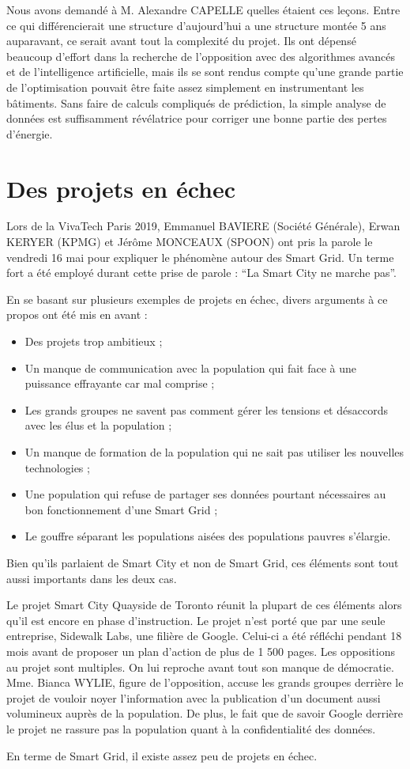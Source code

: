 Nous avons demandé à M. Alexandre CAPELLE quelles étaient ces leçons.
Entre ce qui différencierait une structure d'aujourd'hui a une structure montée 5 ans auparavant,
ce serait avant tout la complexité du projet.
Ils ont dépensé beaucoup d'effort dans la recherche de l'opposition avec des algorithmes avancés
et de l'intelligence artificielle, mais ils se sont rendus compte qu'une grande partie de
l'optimisation pouvait être faite assez simplement en instrumentant les bâtiments.
Sans faire de calculs compliqués de prédiction, la simple analyse de données est suffisamment
révélatrice pour corriger une bonne partie des pertes d'énergie.


\section{Des projets en échec}

Lors de la VivaTech Paris 2019, Emmanuel BAVIERE (Société Générale), Erwan KERYER (KPMG)
et Jérôme MONCEAUX (SPOON) ont pris la parole le vendredi 16 mai pour expliquer le phénomène autour des
Smart Grid. Un terme fort a été employé durant cette prise de parole :
``La Smart City ne marche pas''.

En se basant sur plusieurs exemples de projets en échec, divers arguments à ce propos ont été mis en
avant :
\begin{itemize}
    \item Des projets trop ambitieux ;
    \item Un manque de communication avec la population qui fait face à une puissance effrayante car mal comprise ;
    \item Les grands groupes ne savent pas comment gérer les tensions et désaccords avec les élus et la population ;
    \item Un manque de formation de la population qui ne sait pas utiliser les nouvelles technologies ;
    \item Une population qui refuse de partager ses données pourtant nécessaires au bon fonctionnement d’une Smart Grid ;
    \item Le gouffre séparant les populations aisées des populations pauvres s'élargie.
\end{itemize}
Bien qu'ils parlaient de Smart City et non de Smart Grid, ces éléments sont tout aussi importants dans les deux cas.

Le projet Smart City Quayside de Toronto réunit la plupart de ces éléments alors qu'il est encore en phase d'instruction.
Le projet n'est porté que par une seule entreprise, Sidewalk Labs, une filière de Google.
Celui-ci a été réfléchi pendant 18 mois avant de proposer un plan d'action de plus de 1 500 pages.
Les oppositions au projet sont multiples. On lui reproche avant tout son manque de démocratie.
Mme. Bianca WYLIE, figure de l'opposition, accuse les grands groupes derrière le projet de vouloir noyer l'information
avec la publication d'un document aussi volumineux auprès de la population.
De plus, le fait que de savoir Google derrière le projet ne rassure pas la population quant à la confidentialité des données.

En terme de Smart Grid, il existe assez peu de projets en échec.
